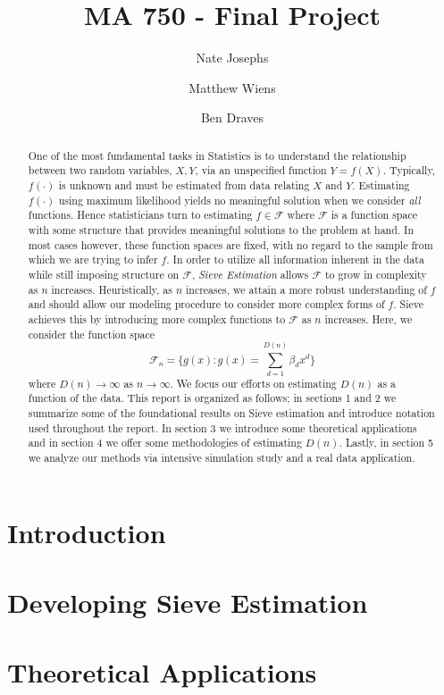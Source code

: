 \documentclass[12pt]{article}  %
\title{MA 750 - Final Project}
\author{
  Nate Josephs\\
  \and
  Matthew Wiens 
  \and 
  Ben Draves
}
\begin{document}
\maketitle 



\begin{abstract} One of the most fundamental tasks in Statistics is to understand the relationship between two random variables, $X,Y$, via an unspecified function $Y = f(X)$. Typically, $f(\cdot)$ is unknown and must be estimated from data relating $X$ and $Y$. Estimating $f(\cdot)$ using maximum likelihood yields no meaningful solution when we consider \textit{all} functions. Hence statisticians turn to estimating $f\in\mathcal{F}$ where $\mathcal{F}$ is a function space with some structure that provides meaningful solutions to the problem at hand. In most cases however, these function spaces are fixed, with no regard to the sample from which we are trying to infer $f$. In order to utilize all information inherent in the data while still imposing structure on $\mathcal{F}$, \textit{Sieve Estimation} allows $\mathcal{F}$ to grow in complexity as $n$ increases. Heuristically, as $n$ increases, we attain a more robust understanding of $f$ and should allow our modeling procedure to consider more complex forms of $f$. Sieve achieves this by introducing more complex functions to $\mathcal{F}$ as $n$ increases. Here, we consider the function space $$\mathcal{F}_n = \Big\{g(x): g(x) = \sum_{d=1}^{D(n)}\beta_dx^d\Big\}$$ where $D(n)\to\infty$ as $n\to\infty$. We focus our efforts on estimating $D(n)$ as a function of the data. This report is organized as follows; in sections 1 and 2 we summarize some of the foundational results on Sieve estimation and introduce notation used throughout the report. In section 3 we introduce some theoretical applications and in section 4 we offer some methodologies of estimating $D(n)$. Lastly, in section 5 we analyze our methods via intensive simulation study and a real data application.


\end{abstract}
  
\section{Introduction}
\section{Developing Sieve Estimation}
\section{Theoretical Applications}
\end{document}
